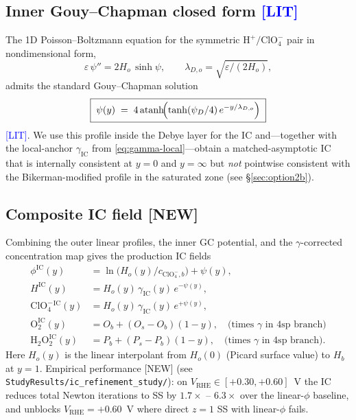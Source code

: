 \documentclass[11pt]{article}
\newcommand{\lit}{\textcolor{blue}{[LIT]}}
\newcommand{\new}{\textcolor{red!70!black}{[NEW]}}
\newcommand{\eps}{\varepsilon}
\newcommand{\ClO}{\text{ClO}_4^-}
\newcommand{\Hp}{\text{H}^+}
\newcommand{\Otwo}{\text{O}_2}
\newcommand{\Htwo}{\text{H}_2\text{O}_2}
\begin{document}
\subsection{Inner Gouy--Chapman closed form \lit}
The 1D Poisson--Boltzmann equation for the symmetric
$\Hp/\ClO$ pair in nondimensional form,
\begin{equation}
  \eps\,\psi'' = 2 H_o\,\sinh\psi,\qquad
  \lambda_{D,o} = \sqrt{\eps/(2H_o)},
\end{equation}
admits the standard Gouy--Chapman solution
\begin{equation}
  \boxed{\;
  \psi(y)\;=\;4\,\text{atanh}\!\Bigl(
       \tanh(\psi_D/4)\,e^{-y/\lambda_{D,o}}
   \Bigr)
  \;}
  \label{eq:GC}
\end{equation}
\cite{newman2004,bazant2009} \lit{}.  We use this profile inside the
Debye layer for the IC and---together with the local-anchor
$\gamma_{\mathrm{IC}}$ from \eqref{eq:gamma-local}---obtain a
matched-asymptotic IC that is internally consistent at $y=0$ and
$y=\infty$ but \emph{not} pointwise consistent with the
Bikerman-modified profile in the saturated zone (see
\S\ref{sec:option2b}).

\subsection{Composite IC field \new}
Combining the outer linear profiles, the inner GC potential, and the
$\gamma$-corrected concentration map gives the production IC fields
\begin{equation}
  \begin{aligned}
    \phi^{\mathrm{IC}}(y) &= \ln\!\bigl(H_o(y)/c_{\ClO,b}\bigr) + \psi(y),\\
    H^{\mathrm{IC}}(y)    &= H_o(y)\,\gamma_{\mathrm{IC}}(y)\,e^{-\psi(y)},\\
    \ClO^{\mathrm{IC}}(y) &= H_o(y)\,\gamma_{\mathrm{IC}}(y)\,e^{+\psi(y)},\\
    \Otwo^{\mathrm{IC}}(y) &= O_b + (O_s-O_b)(1-y) ,\quad \text{(times $\gamma$ in 4sp branch)}\\
    \Htwo^{\mathrm{IC}}(y) &= P_b + (P_s-P_b)(1-y) ,\quad \text{(times $\gamma$ in 4sp branch)}.
  \end{aligned}
  \label{eq:IC-fields}
\end{equation}
Here $H_o(y)$ is the linear interpolant from $H_o(0)$ (Picard surface
value) to $H_b$ at $y=1$.
Empirical performance \new{} (see \texttt{StudyResults/ic\_refinement\_study/}):
on $V_{\mathrm{RHE}}\in[+0.30,+0.60]$~V the IC reduces total Newton
iterations to SS by $1.7\times$ -- $6.3\times$ over the linear-$\phi$
baseline, and unblocks $V_{\mathrm{RHE}}=+0.60$~V where direct $z=1$
SS with linear-$\phi$ fails.
\end{document}
